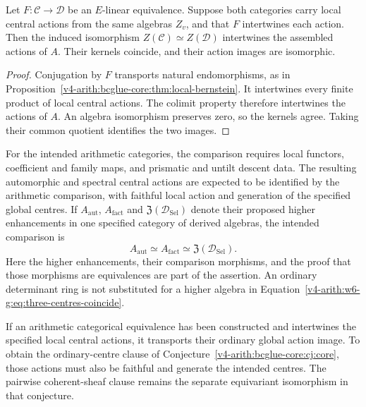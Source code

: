 \begin{proposition}
\label{v4-arith:w6-g:thm:bcglue-across-charts}
Let $F:\mathcal C\to\mathcal D$ be an $E$-linear equivalence.
Suppose both categories carry local central actions from the same
algebras $Z_v$, and that $F$ intertwines each action.
Then the induced isomorphism $Z(\mathcal C)\simeq Z(\mathcal D)$
intertwines the assembled actions of $A$.
Their kernels coincide, and their action images are isomorphic.
\end{proposition}

\begin{proof}
Conjugation by $F$ transports natural endomorphisms, as in
Proposition~\ref{v4-arith:bcglue-core:thm:local-bernstein}.
It intertwines every finite product of local central actions.
The colimit property therefore intertwines the actions of $A$.
An algebra isomorphism preserves zero, so the kernels agree.
Taking their common quotient identifies the two images.
\end{proof}

\begin{conjecture}
\label{v4-arith:w6-g:conj:arithmetic-centres}
For the intended arithmetic categories, the comparison requires
local functors, coefficient and family maps, and prismatic and
untilt descent data.
The resulting automorphic and spectral central actions are expected
to be identified by the arithmetic comparison, with faithful local
action and generation of the specified global centres.
If $A_{\mathrm{aut}}$, $A_{\mathrm{fact}}$ and
$\mathfrak Z(\mathcal D_{\mathrm{Sel}})$ denote their proposed
higher enhancements in one specified category of derived algebras,
the intended comparison is
\begin{equation}
\label{v4-arith:w6-g:eq:three-centres-coincide}
 A_{\mathrm{aut}}\simeq A_{\mathrm{fact}}
       \simeq\mathfrak Z(\mathcal D_{\mathrm{Sel}}).
\end{equation}
Here the higher enhancements, their comparison morphisms, and the
proof that those morphisms are equivalences are part of the assertion.
An ordinary determinant ring is not substituted for a higher
algebra in Equation~\eqref{v4-arith:w6-g:eq:three-centres-coincide}.
\end{conjecture}

\begin{corollary}
\label{v4-arith:w6-g:cor:bcglue-core-closed}
If an arithmetic categorical equivalence has been constructed and
intertwines the specified local central actions, it transports their
ordinary global action image. To obtain the ordinary-centre clause
of Conjecture~\ref{v4-arith:bcglue-core:cj:core}, those actions must also
be faithful and generate the intended centres.
The pairwise coherent-sheaf clause remains the separate equivariant
isomorphism in that conjecture.
\end{corollary}

